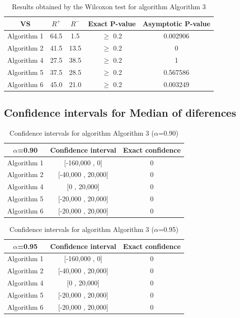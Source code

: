\documentclass[a4paper,10pt]{article}
\begin{document}
\begin{table}[!htp]
\centering\small
\begin{tabular}{
|c|c|c|c|c|}
\hline
 VS & $R^{+}$ & $R^{-}$ & Exact P-value & Asymptotic P-value \\ \hline 
Algorithm 1 & 64.5 & 1.5 & $\geq$ 0.2 & 0.002906\\ \hline 
Algorithm 2 & 41.5 & 13.5 & $\geq$ 0.2 & 0\\ \hline 
Algorithm 4 & 27.5 & 38.5 & $\geq$ 0.2 & 1\\ \hline 
Algorithm 5 & 37.5 & 28.5 & $\geq$ 0.2 & 0.567586\\ \hline 
Algorithm 6 & 45.0 & 21.0 & $\geq$ 0.2 & 0.003249\\ \hline 

\end{tabular}
\caption{Results obtained by the Wilcoxon test for algorithm Algorithm 3}
\end{table}

\subsection{Confidence intervals for Median of diferences}

\begin{table}[!htp]
\centering\small
\begin{tabular}{
|c|c|c|}
\hline
 $\alpha$=0.90 & Confidence interval & Exact confidence \\ \hline 
Algorithm 1 & [-160,000 , 0] & 0\\ \hline 
Algorithm 2 & [-40,000 , 20,000] & 0\\ \hline 
Algorithm 4 & [0 , 20,000] & 0\\ \hline 
Algorithm 5 & [-20,000 , 20,000] & 0\\ \hline 
Algorithm 6 & [-20,000 , 20,000] & 0\\ \hline 

\end{tabular}
\caption{Confidence intervals for algorithm Algorithm 3 ($\alpha$=0.90)}
\end{table}
\begin{table}[!htp]
\centering\small
\begin{tabular}{
|c|c|c|}
\hline
 $\alpha$=0.95 & Confidence interval & Exact confidence \\ \hline 
Algorithm 1 & [-160,000 , 0] & 0\\ \hline 
Algorithm 2 & [-40,000 , 20,000] & 0\\ \hline 
Algorithm 4 & [0 , 20,000] & 0\\ \hline 
Algorithm 5 & [-20,000 , 20,000] & 0\\ \hline 
Algorithm 6 & [-20,000 , 20,000] & 0\\ \hline 

\end{tabular}
\caption{Confidence intervals for algorithm Algorithm 3 ($\alpha$=0.95)}
\end{table}
\end{document}
